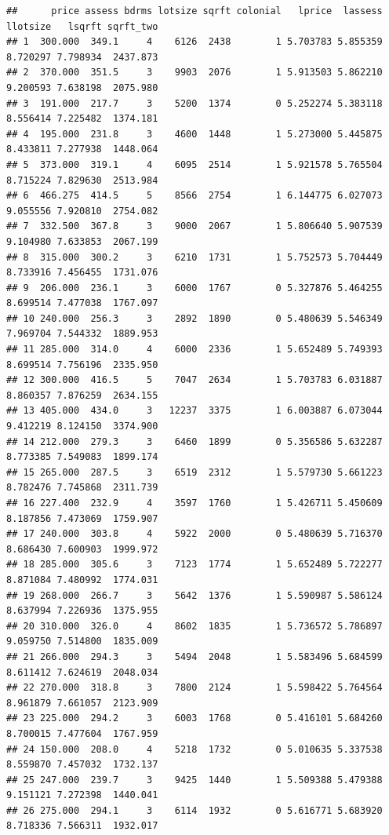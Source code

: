 \documentclass[
]{book}
\theoremstyle{definition}
\theoremstyle{definition}
\theoremstyle{definition}
\theoremstyle{definition}
\theoremstyle{remark}
\begin{document}
\begin{verbatim}
##      price assess bdrms lotsize sqrft colonial   lprice  lassess  llotsize   lsqrft sqrft_two
## 1  300.000  349.1     4    6126  2438        1 5.703783 5.855359  8.720297 7.798934  2437.873
## 2  370.000  351.5     3    9903  2076        1 5.913503 5.862210  9.200593 7.638198  2075.980
## 3  191.000  217.7     3    5200  1374        0 5.252274 5.383118  8.556414 7.225482  1374.181
## 4  195.000  231.8     3    4600  1448        1 5.273000 5.445875  8.433811 7.277938  1448.064
## 5  373.000  319.1     4    6095  2514        1 5.921578 5.765504  8.715224 7.829630  2513.984
## 6  466.275  414.5     5    8566  2754        1 6.144775 6.027073  9.055556 7.920810  2754.082
## 7  332.500  367.8     3    9000  2067        1 5.806640 5.907539  9.104980 7.633853  2067.199
## 8  315.000  300.2     3    6210  1731        1 5.752573 5.704449  8.733916 7.456455  1731.076
## 9  206.000  236.1     3    6000  1767        0 5.327876 5.464255  8.699514 7.477038  1767.097
## 10 240.000  256.3     3    2892  1890        0 5.480639 5.546349  7.969704 7.544332  1889.953
## 11 285.000  314.0     4    6000  2336        1 5.652489 5.749393  8.699514 7.756196  2335.950
## 12 300.000  416.5     5    7047  2634        1 5.703783 6.031887  8.860357 7.876259  2634.155
## 13 405.000  434.0     3   12237  3375        1 6.003887 6.073044  9.412219 8.124150  3374.900
## 14 212.000  279.3     3    6460  1899        0 5.356586 5.632287  8.773385 7.549083  1899.174
## 15 265.000  287.5     3    6519  2312        1 5.579730 5.661223  8.782476 7.745868  2311.739
## 16 227.400  232.9     4    3597  1760        1 5.426711 5.450609  8.187856 7.473069  1759.907
## 17 240.000  303.8     4    5922  2000        0 5.480639 5.716370  8.686430 7.600903  1999.972
## 18 285.000  305.6     3    7123  1774        1 5.652489 5.722277  8.871084 7.480992  1774.031
## 19 268.000  266.7     3    5642  1376        1 5.590987 5.586124  8.637994 7.226936  1375.955
## 20 310.000  326.0     4    8602  1835        1 5.736572 5.786897  9.059750 7.514800  1835.009
## 21 266.000  294.3     3    5494  2048        1 5.583496 5.684599  8.611412 7.624619  2048.034
## 22 270.000  318.8     3    7800  2124        1 5.598422 5.764564  8.961879 7.661057  2123.909
## 23 225.000  294.2     3    6003  1768        0 5.416101 5.684260  8.700015 7.477604  1767.959
## 24 150.000  208.0     4    5218  1732        0 5.010635 5.337538  8.559870 7.457032  1732.137
## 25 247.000  239.7     3    9425  1440        1 5.509388 5.479388  9.151121 7.272398  1440.041
## 26 275.000  294.1     3    6114  1932        0 5.616771 5.683920  8.718336 7.566311  1932.017

\end{verbatim}
\end{document}
